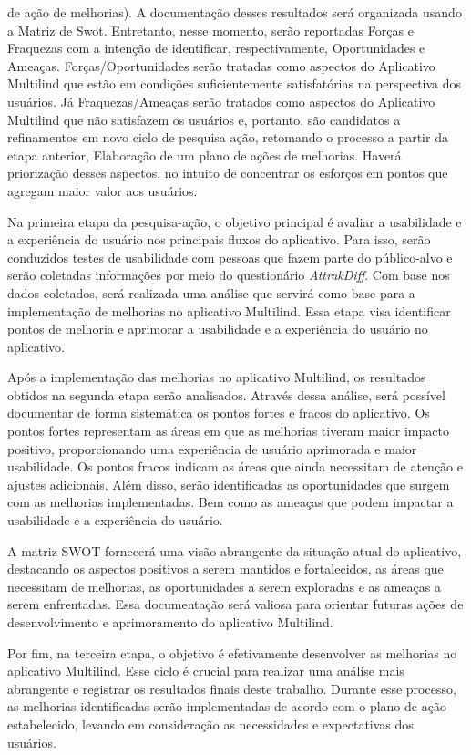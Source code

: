 \begin{itemize}
	de ação de melhorias). A documentação desses resultados será organizada usando a Matriz de Swot. Entretanto, nesse momento, serão reportadas Forças e Fraquezas com a intenção de identificar, respectivamente, Oportunidades e Ameaças. Forças/Oportunidades serão tratadas como aspectos do Aplicativo Multilind que estão em condições suficientemente satisfatórias na perspectiva dos usuários. Já Fraquezas/Ameaças serão tratados como aspectos do Aplicativo Multilind que não satisfazem os usuários e, portanto, são candidatos a refinamentos 
	em novo ciclo de pesquisa ação, retomando o processo a partir da etapa anterior, Elaboração de um plano de ações de melhorias. Haverá priorização desses aspectos, no intuito de concentrar os esforços em pontos que agregam maior valor aos usuários.
\end{itemize}

Na primeira etapa da pesquisa-ação, o objetivo principal é avaliar a usabilidade e a experiência do usuário nos principais fluxos do aplicativo. Para isso, serão conduzidos testes de usabilidade com pessoas que fazem parte do público-alvo e serão coletadas informações por meio do questionário \textit{AttrakDiff}. Com base nos dados coletados, será realizada uma análise que servirá como base para a implementação de melhorias no aplicativo Multilind. Essa etapa visa identificar pontos de melhoria e aprimorar a usabilidade e a experiência do 
usuário no aplicativo.

Após a implementação das melhorias no aplicativo Multilind, os resultados obtidos na segunda etapa serão analisados. Através dessa análise, será possível documentar de forma sistemática os pontos fortes e fracos do aplicativo. Os pontos fortes representam as áreas em que as melhorias tiveram maior impacto positivo, proporcionando uma experiência de usuário aprimorada e maior usabilidade. Os pontos fracos indicam as áreas que ainda necessitam de atenção e ajustes adicionais. Além disso, serão identificadas as oportunidades que surgem com as 
melhorias implementadas. Bem como as ameaças que podem impactar a usabilidade e a experiência do usuário.

A matriz SWOT fornecerá uma visão abrangente da situação atual do aplicativo, destacando os aspectos positivos a serem mantidos e fortalecidos, as áreas que necessitam de melhorias, as oportunidades a serem exploradas e as ameaças a serem enfrentadas. Essa documentação será valiosa para orientar futuras ações de desenvolvimento e aprimoramento do aplicativo Multilind.

Por fim, na terceira etapa, o objetivo é efetivamente desenvolver as melhorias no aplicativo Multilind. Esse ciclo é crucial para realizar uma análise mais abrangente e registrar os resultados finais deste trabalho. Durante esse processo, as melhorias identificadas serão implementadas de acordo com o plano de ação estabelecido, levando em consideração as necessidades e expectativas dos usuários.

